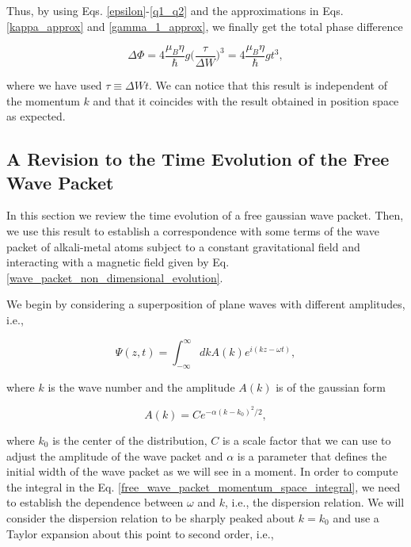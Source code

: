 \documentclass{article}
\begin{document}
Thus, by using Eqs. \ref{epsilon}-\ref{q1_q2} and the approximations in Eqs. \ref{kappa_approx} and \ref{gamma_1_approx}, we finally get the total phase difference

\begin{equation}\label{quantum_gravimetry_signal_momentum_space}
\Delta \Phi = 4 \frac{\mu_{B} \eta }{\hbar} g \bigg(\frac{\tau}{\Delta W}\bigg)^{3} = 4 \frac{\mu_{B} \eta }{\hbar} g t^{3},
\end{equation}

where we have used $\tau\equiv \Delta W t$. We can notice that this result is independent of the momentum $k$ and that it coincides with the result obtained in position space as expected.

\subsection{A Revision to the Time Evolution of the Free Wave Packet}
In this section we review the time evolution of a free gaussian wave packet. Then, we use this result to establish a correspondence with some terms of the wave packet of alkali-metal atoms subject to a constant gravitational field and interacting with a magnetic field given by Eq. \ref{wave_packet_non_dimensional_evolution}.

We begin by considering a superposition of plane waves with different amplitudes, i.e.,

\begin{equation}\label{free_wave_packet_momentum_space_integral}
    \Psi (z, t) =  \int_{- \infty}^{\infty} dk A(k) e^{i (kz-\omega t)} ,
\end{equation}

where $k$ is the wave number and the amplitude $A(k)$ is of the gaussian form

\begin{equation}\label{gaussian_amplitude_free_wave_packet}
    A(k) = C e^{-\alpha(k-k_{0})^{2}/2} ,
\end{equation}

where $k_{0}$ is the center of the distribution, $C$ is a scale factor that we can use to adjust the amplitude of the wave packet and $\alpha$ is a parameter that defines the initial width of the wave packet as we will see in a moment. In order to compute the integral in the Eq. \ref{free_wave_packet_momentum_space_integral}, we need to establish the dependence between $\omega$ and $k$, i.e., the dispersion relation. We will consider the dispersion relation to be sharply peaked about $k=k_{0}$ and use a Taylor expansion about this point to second order, i.e.,
\end{document}
